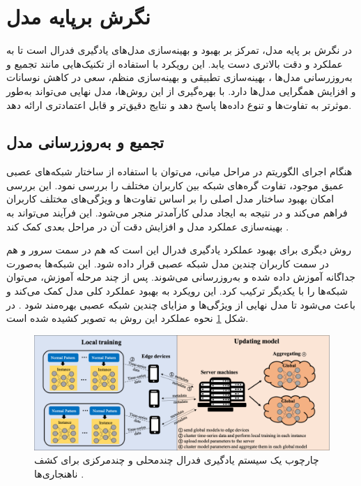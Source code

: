 \section{نگرش برپایه مدل}
در نگرش بر پایه مدل، تمرکز بر بهبود و بهینه‌سازی مدل‌های یادگیری فدرال است تا به عملکرد و دقت بالاتری دست یابد. این رویکرد با استفاده از تکنیک‌هایی مانند
تجمیع و به‌روزرسانی مدل‌ها%
%
، بهینه‌سازی تطبیقی%
و بهینه‌سازی منظم، سعی در کاهش نوسانات و افزایش همگرایی مدل‌ها دارد. با بهره‌گیری از این روش‌ها، مدل نهایی می‌تواند به‌طور موثرتر به تفاوت‌ها و تنوع داده‌ها پاسخ دهد و نتایج دقیق‌تر و قابل اعتمادتری ارائه دهد.

\subsection{
	تجمیع و به‌روزرسانی مدل
}	
هنگام اجرای الگوریتم در مراحل میانی، می‌توان با استفاده از ساختار شبکه‌های عصبی عمیق موجود، تفاوت گره‌های شبکه بین کاربران مختلف را بررسی نمود. این بررسی امکان بهبود ساختار مدل اصلی را بر اساس تفاوت‌ها و ویژگی‌های مختلف کاربران فراهم می‌کند و در نتیجه به ایجاد مدلی کارآمدتر منجر می‌شود. این فرآیند می‌تواند به بهینه‌سازی عملکرد مدل و افزایش دقت آن در مراحل بعدی کمک کند
\cite{sannara2021federated}.

روش دیگری برای بهبود عملکرد یادگیری فدرال این است که هم در سمت سرور و هم در سمت کاربران چندین مدل شبکه عصبی قرار داده شود. این شبکه‌ها به‌صورت جداگانه آموزش داده شده و به‌روزرسانی می‌شوند. پس از چند مرحله آموزش، می‌توان شبکه‌ها را با یکدیگر ترکیب کرد. این رویکرد به بهبود عملکرد کلی مدل کمک می‌کند و باعث می‌شود تا مدل نهایی از ویژگی‌ها و مزایای چندین شبکه عصبی بهره‌مند شود
\cite{qin2021mlmg}.
در شکل
\ref{multi_local_and_multi_global}
نحوه عملکرد این روش به تصویر کشیده شده است. 



\begin{figure}[t]
	\centering
	\includegraphics[scale=0.44]{images/chap3/multi_local_and_multi_global.png}%
	\caption{%
		چارچوب یک سیستم یادگیری فدرال چندمحلی و چندمرکزی برای کشف ناهنجاری‌ها 
		\cite{qin2021mlmg}%
		.
	}
	\label{multi_local_and_multi_global}
	\centering
\end{figure}



